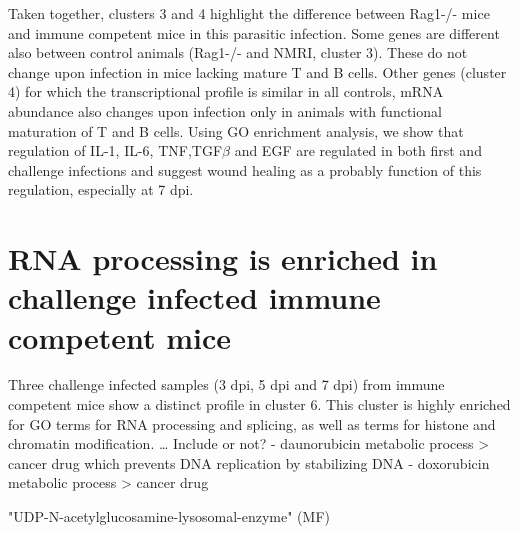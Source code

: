 \documentclass{bmcart}
\begin{document}
Taken together, clusters 3 and 4 highlight the difference between Rag1-/- mice and immune competent mice in this parasitic infection. Some genes are different also between control animals (Rag1-/- and NMRI, cluster 3). These do not change upon infection in mice lacking mature T and B cells. Other genes (cluster 4) for which the transcriptional profile is similar in all controls, mRNA abundance also changes upon infection only in animals with functional maturation of T and B cells. Using GO enrichment analysis, we show that regulation of IL-1, IL-6, TNF,TGF$\beta$ and EGF are regulated in both first and challenge infections and suggest wound healing as a probably function of this regulation, especially at 7 dpi.
 
\section*{RNA processing is enriched in challenge infected immune competent mice} 
Three challenge infected samples (3 dpi, 5 dpi and 7 dpi) from immune competent mice show a distinct profile in cluster 6. This cluster is highly enriched for GO terms for RNA processing and splicing, as well as terms for histone and chromatin modification. \ldots
\newline
Include or not?
- daunorubicin metabolic process > cancer drug which prevents DNA replication by stabilizing DNA
- doxorubicin metabolic process  > cancer drug
\newline
 
"UDP-N-acetylglucosamine-lysosomal-enzyme" (MF)



\end{document}
